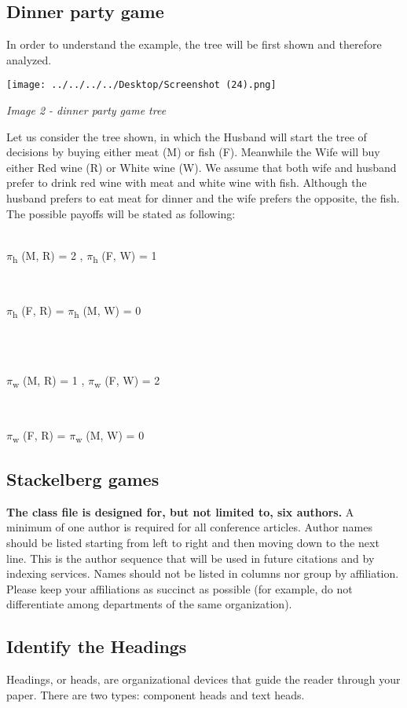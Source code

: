 \documentclass[conference]{IEEEtran}
\begin{document}
\subsection{Dinner party game}
In order to understand the example, the tree will be first shown and therefore analyzed.
\centerline{\texttt{[image: ../../../../Desktop/Screenshot (24).png]}}  
\centerline{\textit{Image 2 - dinner party game tree}}
Let us consider the tree shown, in which the Husband will start the tree of decisions by buying either meat (M) or fish (F). Meanwhile the Wife will buy either Red wine (R) or White wine (W). We assume that both wife and husband prefer to drink red wine with meat and white wine with fish. Although the husband prefers to eat meat for dinner and the wife prefers the opposite, the fish. The possible payoffs will be stated as following:\\ \\
\centerline{$\pi$\textsubscript{h} (M, R) = 2 ,  $\pi$\textsubscript{h} (F, W) = 1} \\
\centerline{$\pi$\textsubscript{h} (F, R) = $\pi$\textsubscript{h} (M, W) = 0} \\\\
\centerline{$\pi$\textsubscript{w} (M, R) = 1 ,  $\pi$\textsubscript{w} (F, W) = 2} \\
\centerline{$\pi$\textsubscript{w} (F, R) = $\pi$\textsubscript{w} (M, W) = 0}




\subsection{Stackelberg games}
\textbf{The class file is designed for, but not limited to, six authors.} A 
minimum of one author is required for all conference articles. Author names 
should be listed starting from left to right and then moving down to the 
next line. This is the author sequence that will be used in future citations 
and by indexing services. Names should not be listed in columns nor group by 
affiliation. Please keep your affiliations as succinct as possible (for 
example, do not differentiate among departments of the same organization).

\subsection{Identify the Headings}
Headings, or heads, are organizational devices that guide the reader through 
your paper. There are two types: component heads and text heads.
\end{document}
